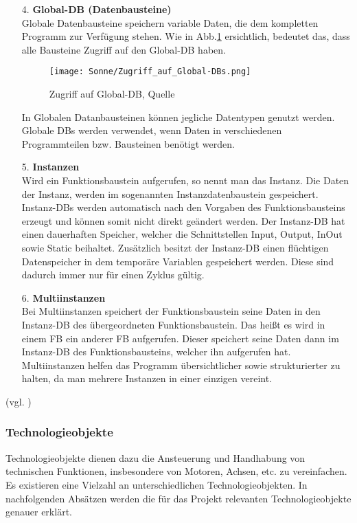 \begin{itemize}
        \item[4.] \textbf{Global-DB (Datenbausteine)} \\
            Globale Datenbausteine speichern variable Daten, die dem kompletten Programm zur Verfügung stehen. Wie in Abb.\ref{Zugriff auf Global-DB} ersichtlich, bedeutet das, dass alle Bausteine Zugriff auf den Global-DB haben.

            \begin{figure}[h]
                \centering
                \texttt{[image: Sonne/Zugriff\_auf\_Global-DBs.png]}
                \caption{Zugriff auf Global-DB, Quelle \cite{Programmierleitfaden_für_S7-1500}}
                \label{Zugriff auf Global-DB}
            \end{figure}

            In Globalen Datanbausteinen können jegliche Datentypen genutzt werden.\\
            Globale DBs werden verwendet, wenn Daten in verschiedenen Programmteilen bzw. Bausteinen benötigt werden.

        \item[5.] \textbf{Instanzen} \\
            Wird ein Funktionsbaustein aufgerufen, so nennt man das Instanz. Die Daten der Instanz, werden im sogenannten Instanzdatenbaustein gespeichert. Instanz-DBs werden automatisch nach den Vorgaben des Funktionsbausteins erzeugt und können somit nicht direkt geändert werden. Der Instanz-DB hat einen dauerhaften Speicher, welcher die Schnittstellen Input, Output, InOut sowie Static beihaltet. Zusätzlich besitzt der Instanz-DB einen flüchtigen Datenspeicher in dem temporäre Variablen gespeichert werden. Diese sind dadurch immer nur für einen Zyklus gültig.
            
        \item[6.] \textbf{Multiinstanzen} \\
            Bei Multiinstanzen speichert der Funktionsbaustein seine Daten in den Instanz-DB des übergeordneten Funktionsbaustein. Das heißt es wird in einem FB ein anderer FB aufgerufen. Dieser speichert seine Daten dann im Instanz-DB des Funktionsbausteins, welcher ihn aufgerufen hat. Multiinstanzen helfen das Programm übersichtlicher sowie strukturierter zu halten, da man mehrere Instanzen in einer einzigen vereint.
            

    \end{itemize}
    (vgl. \cite{Programmierleitfaden_für_S7-1500})

    \subsubsection[Technologieobjekte]{Technologieobjekte}
    Technologieobjekte dienen dazu die Ansteuerung und Handhabung von technischen Funktionen, insbesondere von Motoren, Achsen, etc. zu vereinfachen. Es existieren eine Vielzahl an unterschiedlichen Technologieobjekten. In nachfolgenden Absätzen werden die für das Projekt relevanten Technologieobjekte genauer erklärt.

